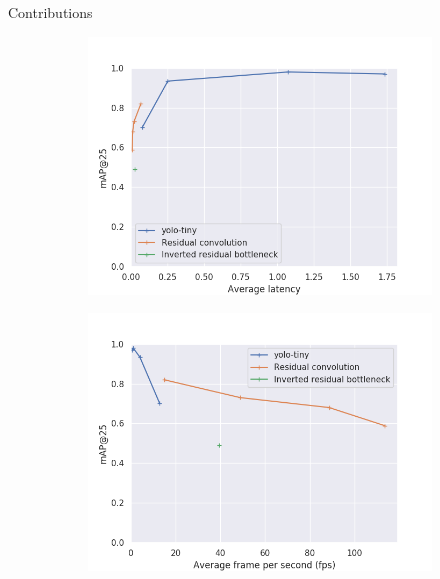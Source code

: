 \documentclass{beamer}
\begin{document}
\begin{frame}{Contributions}
    \begin{figure}
      \begin{center}
        \begin{subfigure}[t]{.45\linewidth}
          \centering
          \includegraphics[width=0.7\linewidth]{figures/map_at_25_latency_models.png}
        \end{subfigure}
        \begin{subfigure}[t]{.45\linewidth}
          \centering
          \includegraphics[width=0.7\linewidth]{figures/map_at_25_fps_models.png}

\end{subfigure}
\end{center}
\end{figure}
\end{frame}
\end{document}
